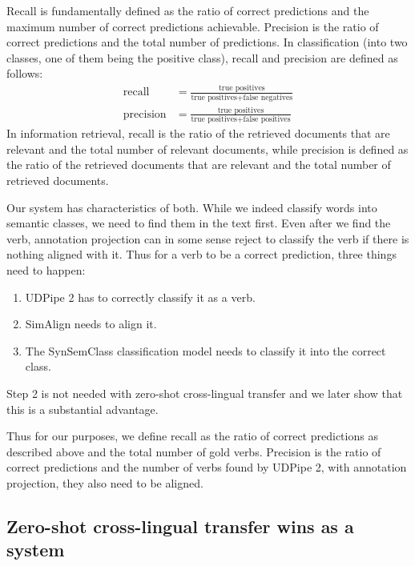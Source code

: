 Recall is fundamentally defined as the ratio of correct predictions and the maximum number of correct predictions achievable. Precision is the ratio of correct predictions and the total number of predictions. In classification (into two classes, one of them being the positive class), recall and precision are defined as follows:
\begin{equation*}
\begin{split}
\text{recall} & = \frac{\text{true positives}}{\text{true positives} + \text{false negatives} } \\[1em]
\text{precision} & = \frac{\text{true positives}}{\text{true positives} + \text{false positives}}
\end{split}
\end{equation*}
In information retrieval, recall is the ratio of the retrieved documents that are relevant and the total number of relevant documents, while precision is defined as the ratio of the retrieved documents that are relevant and the total number of retrieved documents.

Our system has characteristics of both. While we indeed classify words into semantic classes, we need to find them in the text first. Even after we find the verb, annotation projection can in some sense reject to classify the verb if there is nothing aligned with it. Thus for a verb to be a correct prediction, three things need to happen:

\begin{enumerate}
    \itemsep0em
    \item UDPipe 2 has to correctly classify it as a verb.
    \item SimAlign needs to align it.
    \item The SynSemClass classification model needs to classify it into the correct class.
\end{enumerate}

Step 2 is not needed with zero-shot cross-lingual transfer and we later show that this is a substantial advantage.

Thus for our purposes, we define recall as the ratio of correct predictions as described above and the total number of gold verbs. Precision is the ratio of correct predictions and the number of verbs found by UDPipe 2, with annotation projection, they also need to be aligned.

\subsection{Zero-shot cross-lingual transfer wins as a system}

